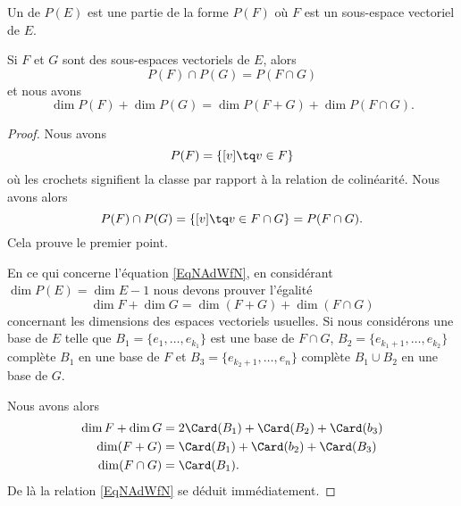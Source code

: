 Un  de \( P(E)\) est une partie de la forme \( P(F)\) où \( F\) est un sous-espace vectoriel de \( E\).

\begin{proposition}     \label{PropuqpWVx}
    Si \( F\) et \( G\) sont des sous-espaces vectoriels de \( E\), alors
    \begin{equation}
        P(F)\cap P(G)=P(F\cap G)
    \end{equation}
    et nous avons
    \begin{equation}        \label{EqNAdWfN}
        \dim P(F)+\dim P(G)=\dim P(F+G)+\dim P(F\cap G).
    \end{equation}
\end{proposition}

\begin{proof}
    Nous avons
    \begin{equation}
        P(F)=\{ [v]\tq v\in F \}
    \end{equation}
    où les crochets signifient la classe par rapport à la relation de colinéarité. Nous avons alors
    \begin{equation}
        P(F)\cap P(G)=\{ [v]\tq v\in F\cap G \}=P(F\cap G).
    \end{equation}
    Cela prouve le premier point.

    En ce qui concerne l'équation \eqref{EqNAdWfN}, en considérant \( \dim P(E)=\dim E-1\) nous devons prouver l'égalité
    \begin{equation}
        \dim F+\dim G=\dim (F+G)+\dim(F\cap G)
    \end{equation}
    concernant les dimensions des espaces vectoriels usuelles. Si nous considérons une base de \( E\) telle que \( B_1=\{ e_1,\ldots, e_{k_1} \}\) est une base de \( F\cap G\), \( B_2=\{ e_{k_1+1},\ldots, e_{k_2} \}\) complète \( B_1\) en une base de \( F\) et \( B_3=\{ e_{k_2+1},\ldots, e_n \}\) complète \( B_1\cup B_2\) en une base de \( G\).

    Nous avons alors
    \begin{subequations}
        \begin{align}
            \dim F+\dim G&=2\Card(B_1)+\Card(B_2)+\Card(b_3)\\
            \dim(F+G)&=\Card(B_1)+\Card(b_2)+\Card(B_3)\\
            \dim(F\cap G)&=\Card(B_1).
        \end{align}
    \end{subequations}
    De là la relation \eqref{EqNAdWfN} se déduit immédiatement.
\end{proof}

